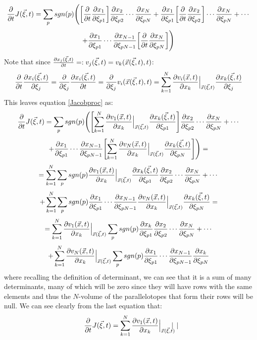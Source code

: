 \documentclass[11pt, a4paper]{article} %
\DeclareRobustCommand{\mybox}[2][gray!10]{%
\begin{tcolorbox}[   %
        left=0.2cm,
        right=0.2cm,
        top=0.15cm,
        bottom=0.15cm,
        colback=#1,
        colframe=#1,
        width=\dimexpr\textwidth\relax, 
        enlarge left by=0mm,
        boxsep=5pt,
        arc=0pt,outer arc=0pt,
        ]
        #2
\end{tcolorbox}
}
\begin{document}
\mybox{
\begin{equation}\label{Jacobproc}
\pdv{}{t}J(\vec{\xi},t)=\sum_p sgn(p) \Bigg(\qty[\pdv{}{t}\pdv{x_1}{\xi_{p1}}]\pdv{x_2}{\xi_{p2}} \cdots \pdv{x_N}{\xi_{pN}}+\pdv{x_1}{\xi_{p1}}\qty[\pdv{}{t}\pdv{x_2}{\xi_{p2}}] \cdots \pdv{x_N}{\xi_{pN}}+\cdots
\end{equation}
$$
+\pdv{x_1}{\xi_{p1}} \cdots \pdv{x_{N-1}}{\xi_{pN-1}}\qty[\pdv{}{t}\pdv{x_N}{\xi_{pN}}]\Bigg)
$$
Note that since $\pdv{x_j(\vec{\xi},t)}{t}=:v_j(\vec{\xi},t)=v_k(\vec{x}(\vec{\xi},t),t)$:
\begin{equation}
\pdv{}{t}\pdv{x_i(\vec{\xi},t)}{\xi_j}=\pdv{}{\xi_j}\pdv{x_i(\vec{\xi},t)}{t}=\pdv{}{\xi_j}v_i(\vec{x}(\vec{\xi},t),t)=\sum_{k=1}^N \pdv{v_i(\vec{x},t)}{x_k}\Big\rvert_{\vec{x}(\vec{\xi},t)}\pdv{x_k(\vec{\xi},t)}{\xi_j}
\end{equation}
This leaves equation \eqref{Jacobproc} as:
\begin{equation}
\pdv{}{t}J(\vec{\xi},t)=\sum_p sgn(p) \Bigg(\qty[\sum_{k=1}^N \pdv{v_1(\vec{x},t)}{x_k}\Big\rvert_{\vec{x}(\vec{\xi},t)}\pdv{x_k(\vec{\xi},t)}{\xi_{p1}}]\pdv{x_2}{\xi_{p2}} \cdots \pdv{x_N}{\xi_{pN}}+\cdots
\end{equation}
$$
+\pdv{x_1}{\xi_{p1}} \cdots \pdv{x_{N-1}}{\xi_{pN-1}}\qty[\sum_{k=1}^N \pdv{v_N(\vec{x},t)}{x_k}\Big\rvert_{\vec{x}(\vec{\xi},t)}\pdv{x_k(\vec{\xi},t)}{\xi_{pN}}]\Bigg)=
$$
$$
=\sum_{k=1}^N\sum_p sgn(p) \pdv{v_1(\vec{x},t)}{x_k}\Big\rvert_{\vec{x}(\vec{\xi},t)}\pdv{x_k(\vec{\xi},t)}{\xi_{p1}}\pdv{x_2}{\xi_{p2}} \cdots \pdv{x_N}{\xi_{pN}}+\cdots 
$$
$$
+ \sum_{k=1}^N\sum_p sgn(p)\pdv{x_1}{\xi_{p1}} \cdots \pdv{x_{N-1}}{\xi_{pN-1}}\pdv{v_N(\vec{x},t)}{x_k}\Big\rvert_{\vec{x}(\vec{\xi},t)}\pdv{x_k(\vec{\xi},t)}{\xi_{pN}}=
$$
$$
=\sum_{k=1}^N \pdv{v_1(\vec{x},t)}{x_k}\Big\rvert_{\vec{x}(\vec{\xi},t)}\sum_p sgn(p)\pdv{x_k}{\xi_{p1}}\pdv{x_2}{\xi_{p2}} \cdots \pdv{x_N}{\xi_{pN}}+\cdots 
$$
$$
+ \sum_{k=1}^N\pdv{v_N(\vec{x},t)}{x_k}\Big\rvert_{\vec{x}(\vec{\xi},t)}\sum_p sgn(p)\pdv{x_1}{\xi_{p1}} \cdots \pdv{x_{N-1}}{\xi_{pN-1}}\pdv{x_k}{\xi_{pN}}
$$
where recalling the definition of determinant, we can see that it is a sum of many determinants, many of which will be zero since they will have rows with the same elements and thus the $N$-volume of the parallelotopes that form their rows will be null. We can see clearly from the last equation that:
\begin{equation}
\pdv{}{t}J(\vec{\xi},t)=\sum_{k=1}^N \pdv{v_1(\vec{x},t)}{x_k}\Big\rvert_{\vec{x}(\vec{\xi},t)} \begin{vmatrix}

\end{vmatrix}
\end{equation}}
\end{document}
